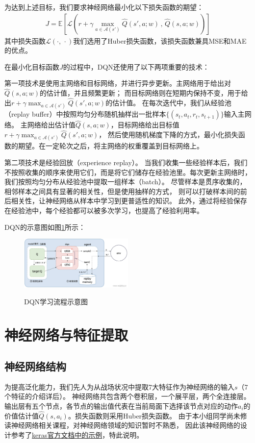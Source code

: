 \documentclass[10pt]{article}
\begin{document}
为达到上述目标，我们要求神经网络最小化以下损失函数的期望：
\begin{align}
J = \mathbb{E} \left[ \mathcal{L}\left(r + \gamma \mathop{\max}_{a\in \mathcal{A}(s')}\hat{Q}(s',a;w)\,,\,\hat{Q}(s,a;w)  \right)  \right]	
\end{align}
其中损失函数$\mathcal{L}(\cdot,\,\cdot)$我们选用了Huber损失函数，该损失函数兼具MSE和MAE的优点。

在最小化目标函数$J$的过程中，DQN还使用了以下两项重要的技术：

第一项技术是使用主网络和目标网络，并进行异步更新。主网络用于给出对$\hat{Q}(s,a;w)$的估计值，并且频繁更新；
而目标网络则在短期内保持不变，用于给出$r + \gamma \mathop{\max}_{a\in \mathcal{A}(s')}\hat{Q}(s',a;w)$的估计值。
在每次迭代中，我们从经验池（replay buffer）中按照均匀分布随机抽样出一批样本$\{(s_t,a_t,r_t,s_{t+1})\}$输入主网络。
主网络给出估计值$\hat{Q}(s,a;w)$，目标网络给出目标值$r + \gamma \mathop{\max}_{a\in \mathcal{A}(s')}\hat{Q}(s',a;w)$，
然后使用随机梯度下降的方式，最小化损失函数的期望。在一定轮次之后，将主网络的权重覆盖到目标网络上。

第二项技术是经验回放（experience replay）。
当我们收集一些经验样本后，我们不按照收集的顺序来使用它们，而是将它们储存在经验池里。每次更新主网络时，
我们按照均匀分布从经验池中提取一组样本（batch）。
尽管样本是贯序收集的，相邻样本之间具有显著的相关性，但是使用抽样的方式，
则可以打破样本间的前后相关性，让神经网络从样本中学习到更普适性的知识。
此外，通过将经验保存在经验池中，每个经验都可以被多次学习，也提高了经验利用率。

DQN的示意图如图\ref{dqn}所示：
\begin{figure}[H]
	\centering
	{\includegraphics[width=0.5\textwidth]{image//DQN示意图.png}} 
	\caption{DQN学习流程示意图} \label{dqn}
\end{figure}

\section{神经网络与特征提取}

\subsection{神经网络结构}
为提高泛化能力，我们先人为从战场状况中提取7大特征作为神经网络的输入$s$（7个特征的介绍详后）。
神经网络共包含两个卷积层，一个展平层，两个全连接层。
输出层有五个节点，各节点的输出值代表在当前局面下选择该节点对应的动作$a_i$的价值估计值$\hat{Q}(s,a_i)$。损失函数则采用Huber损失函数。
由于本小组同学尚未修读神经网络相关课程，对神经网络领域的知识暂时不熟悉，
因此该神经网络的设计参考了\href{https://keras.io/examples/rl/deep_q_network_breakout/}{keras官方文档中的示例}，特此说明。
\end{document}
